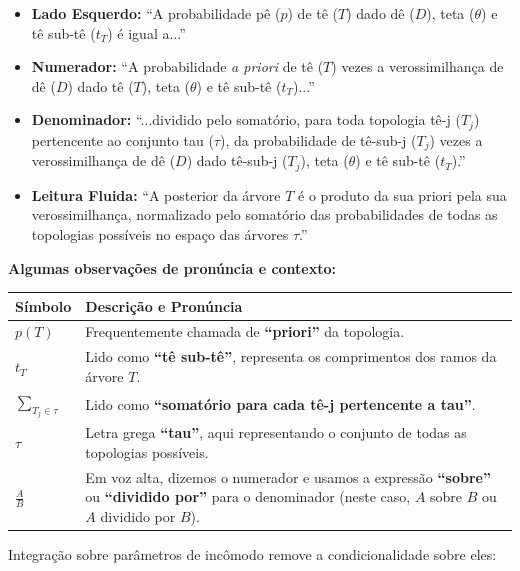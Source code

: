 \begin{itemize}
    \item \textbf{Lado Esquerdo:} ``A probabilidade pê ($p$) de tê ($T$) dado dê ($D$), teta ($\theta$) e tê sub-tê ($t_T$) é igual a...''
    \item \textbf{Numerador:} ``A probabilidade \textit{a priori} de tê ($T$) vezes a verossimilhança de dê ($D$) dado tê ($T$), teta ($\theta$) e tê sub-tê ($t_T$)...''
    \item \textbf{Denominador:} ``...dividido pelo somatório, para toda topologia tê-j ($T_j$) pertencente ao conjunto tau ($\tau$), da probabilidade de tê-sub-j ($T_j$) vezes a verossimilhança de dê ($D$) dado tê-sub-j ($T_j$), teta ($\theta$) e tê sub-tê ($t_T$).''
    \item \textbf{Leitura Fluida:} ``A posterior da árvore $T$ é o produto da sua priori pela sua verossimilhança, normalizado pelo somatório das probabilidades de todas as topologias possíveis no espaço das árvores $\tau$.''
\end{itemize}

\vspace{0.5cm}

\textbf{Algumas observações de pronúncia e contexto:}

\begin{center}
\renewcommand{\arraystretch}{1.5}
\begin{tabular}{lp{10cm}}
\hline
\textbf{Símbolo} & \textbf{Descrição e Pronúncia} \\ \hline
$p(T)$ & Frequentemente chamada de \textbf{``priori''} da topologia. \\
$t_T$ & Lido como \textbf{``tê sub-tê''}, representa os comprimentos dos ramos da árvore $T$. \\
$\sum_{T_j \in \tau}$ & Lido como \textbf{``somatório para cada tê-j pertencente a tau''}. \\
$\tau$ & Letra grega \textbf{``tau''}, aqui representando o conjunto de todas as topologias possíveis. \\
$\frac{A}{B}$ & Em voz alta, dizemos o numerador e usamos a expressão \textbf{``sobre''} ou \textbf{``dividido por''} para o denominador (neste caso, $A$ sobre $B$ ou $A$ dividido por $B$). \\ \hline
\end{tabular}
\end{center}

Integração sobre parâmetros de incômodo remove a condicionalidade sobre eles:


